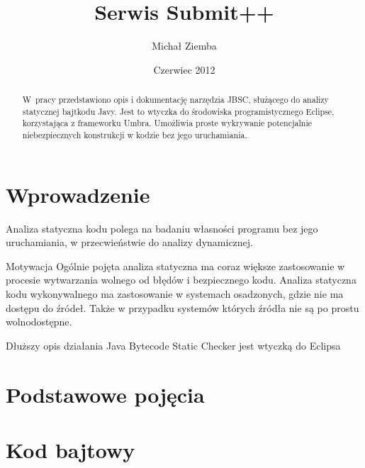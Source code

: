 \documentclass{pracamgr}
\author{Michał Ziemba}
\title{Serwis Submit++}
\date{Czerwiec 2012}
\begin{document}
\maketitle

\begin{abstract}
  W~pracy przedstawiono opis i dokumentację narzędzia JBSC, służącego do
  analizy statycznej bajtkodu Javy. Jest to wtyczka do środowiska programistycznego
  Eclipse, korzystająca z frameworku Umbra. Umożliwia proste wykrywanie potencjalnie
  niebezpiecznych konstrukcji w kodzie bez jego uruchamiania.
\end{abstract}

\tableofcontents

\chapter*{Wprowadzenie}

    Analiza statyczna kodu polega na badaniu własności programu bez jego uruchamiania,
    w przecwieństwie do analizy dynamicznej. 

    Motywacja
    Ogólnie pojęta analiza statyczna ma coraz większe zastosowanie w procesie wytwarzania wolnego od błędów
    i bezpiecznego kodu. Analiza statyczna kodu wykonywalnego ma zastosowanie w systemach osadzonych, gdzie
    nie ma dostępu do źródeł. Także w przypadku systemów których źródła nie są po prostu wolnodostępne.

Dłuższy opis działania
Java Bytecode Static Checker jest wtyczką do Eclipsa 


\chapter{Podstawowe pojęcia}\label{r:pojecia}


\chapter{Kod bajtowy}\label{r:bytecode}
    
\end{document}
